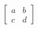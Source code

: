 \documentclass[preview]{standalone}
\begin{document}
\begin{align*}
\begin{bmatrix}a & b\\c & d\end{bmatrix}
\end{align*}
\end{document}
